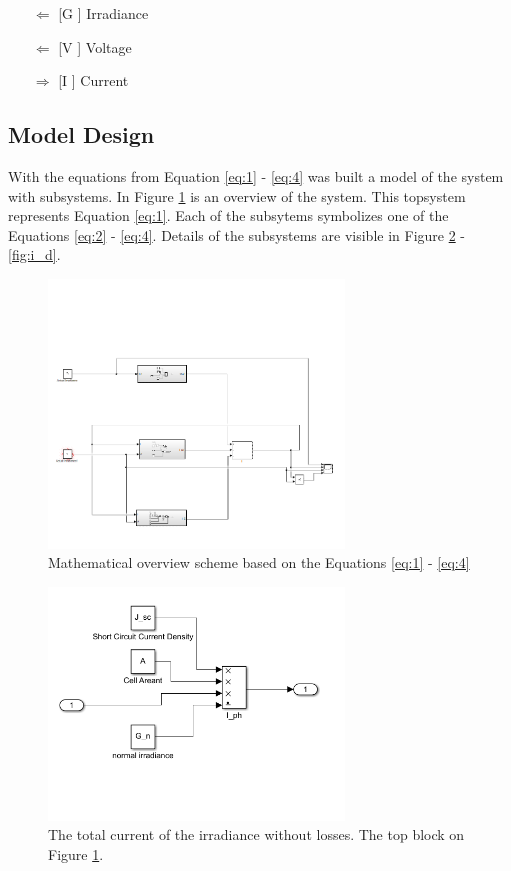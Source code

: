 		\begin{itemize}
			\item[$\Leftarrow$ [G]] Irradiance
			\item[$\Leftarrow$ [V]] Voltage
			\item[$\Rightarrow$ [I]] Current
		\end{itemize}
	

	\subsection{Model Design}
	With the equations from Equation \ref{eq:1} - \ref{eq:4} was built a model of the system with subsystems.
	In Figure \ref{fig:overview} is an overview of the system. This topsystem represents Equation \ref{eq:1}. Each of the subsytems symbolizes one of the  Equations \ref{eq:2} - \ref{eq:4}. Details of the subsystems are visible in Figure \ref{fig:i_ph} - \ref{fig:i_d}.

		\begin{figure}[H]
			\centering
			\includegraphics[width=0.7\textwidth]{figures/overview.png}
			\caption{Mathematical overview scheme based on the Equations \ref{eq:1} - \ref{eq:4}}
			\label{fig:overview}
		\end{figure}
	
		\begin{figure}[H]
			\centering
			\includegraphics[width=0.7\textwidth]{figures/i_ph.png}
			\caption[The total current of the irradiance without losses.]{The total current of the irradiance without losses. The top block on Figure \ref{fig:overview}.}
			\label{fig:i_ph}
		\end{figure}
	
